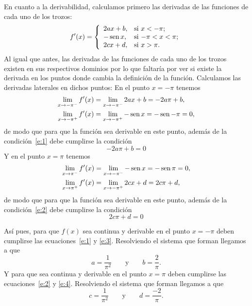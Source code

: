 {En cuanto a la derivabilidad, calculamos primero las derivadas de las funciones de cada uno de los trozos:
\[f'(x)=
\left\{%
\begin{array}{ll}
  2ax+b, & \hbox{si $x<-\pi$;} \\
  -\sen x, & \hbox{si $-\pi< x< \pi$;} \\
  2cx+d, & \hbox{si $x>\pi$.} \\
\end{array}%
\right.
\]
Al igual que antes, las derivadas de las funciones de cada uno de los trozos existen en sus respectivos dominios por lo que faltaría por ver si existe la derivada en los puntos donde cambia la definición de la función. Calculamos las derivadas laterales en dichos puntos: En el punto $x=-\pi$ tenemos
\begin{align*}
\lim_{x\rightarrow -\pi^{-}} f'(x) &=  \lim_{x\rightarrow -\pi^{-}} 2ax+b = -2a\pi+b,\\
\lim_{x\rightarrow -\pi^{+}} f'(x) &=  \lim_{x\rightarrow -\pi^{+}} -\operatorname{sen} x = -\operatorname{sen} -\pi = 0,
\end{align*}
de modo que para que la función sea derivable en este punto, además de la condición~\ref{e:1} debe cumplirse la condición
\begin{equation}
-2a\pi+b = 0
\label{e:3}
\end{equation}
Y en el punto $x=\pi$ tenemos
\begin{align*}
\lim_{x\rightarrow \pi^{-}} f'(x) &=  \lim_{x\rightarrow -\pi^{-}} -\operatorname{sen} x = -\operatorname{sen} \pi = 0,\\
\lim_{x\rightarrow \pi^{+}} f'(x) &=  \lim_{x\rightarrow -\pi^{+}} 2cx+d = 2c\pi+d,
\end{align*}
de modo que para que la función sea derivable en este punto, además de la condición~\ref{e:2} debe cumplirse la condición
\begin{equation}
2c\pi+d = 0
\label{e:4}
\end{equation}

Así pues, para que $f(x)$ sea continua y derivable en el punto $x=-\pi$ deben cumplirse las ecuaciones~\ref{e:1} y \ref{e:3}. Resolviendo el sistema que forman llegamos a que
\[
a = \frac{1}{\pi^{2}} \qquad \mbox{y} \qquad b=\frac{2}{\pi}.
\]
Y para que sea continua y derivable en el punto $x=\pi$ deben cumplirse las ecuaciones~\ref{e:2} y \ref{e:4}. Resolviendo el sistema que forman llegamos a que
\[
c = \frac{1}{\pi^{2}} \qquad \mbox{y} \qquad d=\frac{-2}{\pi}.
\]
}


